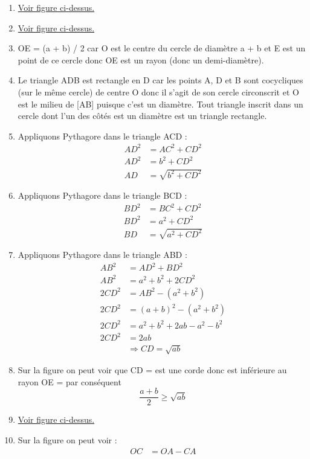 \documentclass[11pt]{article}
\begin{document}
\begin{enumerate}
\item \hyperref[org8248915]{Voir figure ci-dessus.}
\item \hyperref[org8248915]{Voir figure ci-dessus.}
\item OE = (a + b) / 2 car O est le centre du cercle de diamètre
a + b et E est un point de ce cercle donc OE est un rayon (donc
un demi-diamètre).
\item Le triangle ADB est rectangle en D car les points A, D et B sont
cocycliques (sur le même cercle) de centre O donc il s'agit de son
cercle circonscrit et O est le milieu de [AB] puisque c'est un
diamètre. Tout triangle inscrit dans un cercle dont l'un des côtés
est un diamètre est un triangle rectangle.
\item Appliquons Pythagore dans le triangle ACD : 
\begin{align*}
	AD^2 &= AC^2 + CD^2 \\
	AD^2 &= b^2 + CD^2 \\
	AD &= \sqrt{b^2 + CD^2}
\end{align*}
\item Appliquons Pythagore dans le triangle BCD : 
\begin{align*}
	BD^2 &= BC^2 + CD^2 \\
	BD^2 &= a^2 + CD^2 \\
	BD &= \sqrt{a^2 + CD^2}
\end{align*}
\item Appliquons Pythagore dans le triangle ABD : 
\begin{align*}
	AB^2 &= AD^2 + BD^2 \\
	AB^2 &= a^2 + b^2 + 2CD^2 \\
	2CD^2 &= AB^2 - (a^2 + b^2) \\
	2CD^2 &= (a + b)^2 - (a^2 + b^2) \\
	2CD^2 &= a^2 + b^2 + 2ab - a^2 - b^2\\
	2CD^2 &= 2ab \\
	&\Rightarrow \boxed{CD = \sqrt{ab}}
\end{align*}
\item Sur la figure on peut voir que CD =  est une corde donc
est inférieure au rayon OE =  par conséquent
\[\frac{a + b}{2}\geq \sqrt{ab}\]
\item \hyperref[org8248915]{Voir figure ci-dessus.}
\item Sur la figure on peut voir : 
\begin{align*}
	OC &= OA - CA\\

\end{align*}
\end{enumerate}
\end{document}
